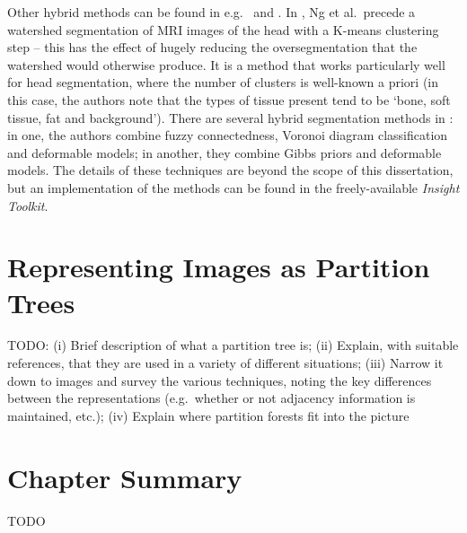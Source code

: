 Other hybrid methods can be found in e.g.~\cite{ng06} and \cite{itk}. In \cite{ng06}, Ng et al.\ precede a watershed segmentation of MRI images of the head with a K-means clustering step -- this has the effect of hugely reducing the oversegmentation that the watershed would otherwise produce. It is a method that works particularly well for head segmentation, where the number of clusters is well-known a priori (in this case, the authors note that the types of tissue present tend to be `bone, soft tissue, fat and background'). There are several hybrid segmentation methods in \cite{itk}: in one, the authors combine fuzzy connectedness, Voronoi diagram classification and deformable models; in another, they combine Gibbs priors and deformable models. The details of these techniques are beyond the scope of this dissertation, but an implementation of the methods can be found in the freely-available \emph{Insight Toolkit}.

\section{Representing Images as Partition Trees}
\label{sec:background-partitiontrees}

TODO: (i) Brief description of what a partition tree is; (ii) Explain, with suitable references, that they are used in a variety of different situations; (iii) Narrow it down to images and survey the various techniques, noting the key differences between the representations (e.g.~whether or not adjacency information is maintained, etc.); (iv) Explain where partition forests fit into the picture

\section{Chapter Summary}

TODO
